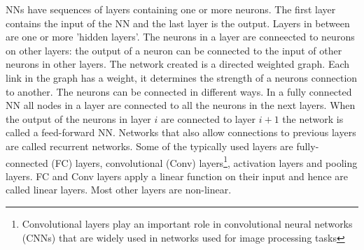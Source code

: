 \documentclass[../thesis.tex]{subfiles}
\begin{document}


NNs have sequences of layers containing one or more neurons. The first layer contains the input of the NN and the last layer is the output. Layers in between are one or more 'hidden layers'. The neurons in a layer are conneected to neurons on other layers: the output of a neuron can be connected to the input of other neurons in other layers. The network created is a directed weighted graph. Each link in the graph has a weight, it determines the strength of a neurons connection to another. The neurons can be connected in different ways. In a fully connected NN all nodes in a layer are connected to all the neurons in the next layers. When the output of the neurons in layer $i$ are connected to layer $i+1$ the network is called a feed-forward NN. Networks that also allow connections to previous layers are called recurrent networks. Some of the typically used layers are fully-connected (FC) layers, convolutional (Conv) layers\footnote{Convolutional layers play an important role in convolutional neural networks (CNNs) that are widely used in networks used for image processing tasks}, activation layers and pooling layers. FC and Conv layers apply a linear function on their input and hence are called linear layers. Most other layers are non-linear. 
\end{document}
